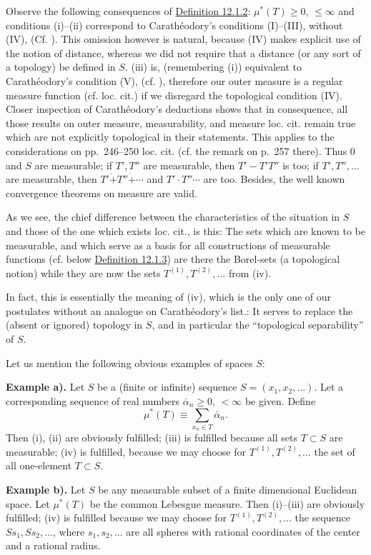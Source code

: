\documentclass[12pt,b5paper,twoside]{article}
\newcommand{\defref}[1]{\hyperref[def:#1]{Definition #1}}
\begin{document}
Observe the following consequences of \defref{12.1.2}: $\mu^*(T)\geq0$,
$\leq\infty$ and conditions (i)--(ii) correspond to Carath\'eodory's
conditions (I)--(III), without (IV), (Cf. \cite[pp.~238--239]{ref4}). This
omission however is natural, because (IV) makes explicit use of the notion of
distance, whereas we did not require that a distance (or any sort of a topology)
be defined in $S$. (iii) is, (remembering (i)) equivalent to Carath\'eodory's
condition (V), (cf. \cite[p.~258]{ref4}), therefore our outer measure is a
regular measure function (cf. loc. cit.) if we disregard the topological
condition (IV). Closer inspection of Carath\'eodory's deductions shows that in
consequence, all those results on outer measure, measurability, and measure loc.
cit. remain true which are not explicitly topological in their statements. This
applies to the considerations on pp.~246--250 loc. cit. (cf. the remark on
p.~257 there). Thus $0$ and $S$ are measurable; if $T',T''$ are measurable,
then $T'-T'T''$ is too; if $T',T'',\ldots$ are measurable, then
$T'\mathbin{\dot+}T''\mathbin{\dot+}\cdots$ and
$T'\cdot T''\cdots$ are too. Besides, the well known convergence theorems on
measure are valid.

As we see, the chief difference between the characteristics of the situation in
$S$ and those of the one which exists loc. cit., is this: The sets which are
known to be measurable, and which serve as a basis for all constructions of
measurable functions (cf. below \defref{12.1.3}) are there the Borel-sets (a
topological notion) while they are now the sets
$T^{(1)},T^{(2)},\ldots$ from (iv).

In fact, this is essentially the meaning of (iv), which is the only one of our
postulates without an analogue on Carath\'eodory's list.: It serves to replace
the (absent or ignored) topology in $S$, and in particular the ``topological
separability'' of $S$.

Let us mention the following obvious examples of spaces $S$:

\textbf{Example a).} Let $S$ be a (finite or infinite) sequence
$S=(x_1,x_2,\ldots)$. Let a corresponding sequence of real numbers
$\bar\alpha_n\geq0$, $<\infty$ be given. Define
\[
 \mu^*(T)\equiv\sum_{x_n\in T}\bar\alpha_n.
\]
Then (i), (ii) are obviously fulfilled; (iii) is fulfilled because all sets
$T\subset S$ are measurable; (iv) is fulfilled, because we may choose for
$T^{(1)},T^{(2)},\ldots$ the set of all one-element $T\subset S$.

\textbf{Example b).} Let $S$ be any measurable subset of a finite dimensional
Euclidean space. Let $\mu^*(T)$ be the common Lebesgue measure. Then
(i)--(iii) are obviously fulfilled; (iv) is fulfilled because we may choose for
$T^{(1)},T^{(2)},\ldots$ the sequence $Ss_1,Ss_2,\ldots$, where
$s_1,s_2,\ldots$ are all spheres with rational coordinates of the center and a
rational radius.
\end{document}
